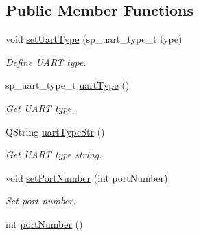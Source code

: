 \subsection*{Public Member Functions}
\begin{DoxyCompactItemize}
\item 
\hypertarget{classmdt_serial_port_interface_adace72e1a326bf9a3d990dd77ed834c4}{
void \hyperlink{classmdt_serial_port_interface_adace72e1a326bf9a3d990dd77ed834c4}{setUartType} (sp\_\-uart\_\-type\_\-t type)}
\label{classmdt_serial_port_interface_adace72e1a326bf9a3d990dd77ed834c4}

\begin{DoxyCompactList}\small\item\em Define UART type. \end{DoxyCompactList}\item 
\hypertarget{classmdt_serial_port_interface_a964e6779c974b90a097691979220d3ce}{
sp\_\-uart\_\-type\_\-t \hyperlink{classmdt_serial_port_interface_a964e6779c974b90a097691979220d3ce}{uartType} ()}
\label{classmdt_serial_port_interface_a964e6779c974b90a097691979220d3ce}

\begin{DoxyCompactList}\small\item\em Get UART type. \end{DoxyCompactList}\item 
\hypertarget{classmdt_serial_port_interface_ae5f174b190e1cafbd0bb154f388903da}{
QString \hyperlink{classmdt_serial_port_interface_ae5f174b190e1cafbd0bb154f388903da}{uartTypeStr} ()}
\label{classmdt_serial_port_interface_ae5f174b190e1cafbd0bb154f388903da}

\begin{DoxyCompactList}\small\item\em Get UART type string. \end{DoxyCompactList}\item 
\hypertarget{classmdt_serial_port_interface_a1a61dadc7b56672d2d303f356e22e21e}{
void \hyperlink{classmdt_serial_port_interface_a1a61dadc7b56672d2d303f356e22e21e}{setPortNumber} (int portNumber)}
\label{classmdt_serial_port_interface_a1a61dadc7b56672d2d303f356e22e21e}

\begin{DoxyCompactList}\small\item\em Set port number. \end{DoxyCompactList}\item 
\hypertarget{classmdt_serial_port_interface_a444b1b5c04539683f43923c55bb01bc5}{
int \hyperlink{classmdt_serial_port_interface_a444b1b5c04539683f43923c55bb01bc5}{portNumber} ()}
\label{classmdt_serial_port_interface_a444b1b5c04539683f43923c55bb01bc5}


\end{DoxyCompactItemize}
